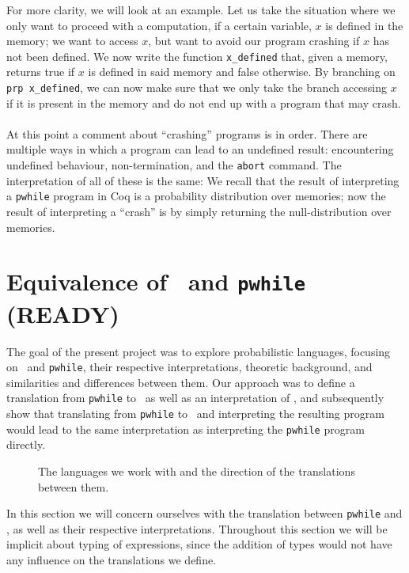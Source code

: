 \documentclass[11pt, leqno, titlepage]{article}
\theoremstyle{definition}
\begin{document}
For more clarity, we will look at an example. Let us take the situation where we only
want to proceed with a computation, if a certain variable, $x$ is defined in the
memory; we want to access $x$, but want to avoid our program crashing if $x$ has not
been defined. We now write the function \texttt{x\_defined} that, given a memory,
returns true if $x$ is defined in said memory and false otherwise. By branching on
\texttt{prp x\_defined}, we can now make sure that we only take the branch accessing
$x$ if it is present in the memory and do not end up with a program that may
crash. \\
\\
At this point a comment about ``crashing'' programs is in order. There are multiple
ways in which a program can lead to an undefined result: encountering undefined
behaviour, non-termination, and the \texttt{abort} command. The interpretation of all
of these is the same: We recall that the result of interpreting a \texttt{pwhile}
program in Coq is a probability distribution over memories; now the result of
interpreting a ``crash'' is by simply returning the null-distribution over memories.


\section{Equivalence of \rml\ and \texttt{pwhile} (READY)}
\label{sec:approach}
The goal of the present project was to explore probabilistic languages, focusing on
\rml\ and \texttt{pwhile}, their respective interpretations, theoretic background,
and similarities and differences between them. Our approach was to define a
translation from \texttt{pwhile} to \rml\ as well as an interpretation of \rml,
and subsequently show that translating from \texttt{pwhile} to \rml\ and interpreting
the resulting program would lead to the same interpretation as interpreting the
\texttt{pwhile} program directly.

\begin{figure}[h]
  \centering
  \caption{The languages we work with and the direction of the translations between
    them. }
  \label{fig:triangle}
\end{figure}

In this section we will concern ourselves with the translation between
\texttt{pwhile} and \rml, as well as their respective interpretations. Throughout
this section we will be implicit about typing of expressions, since the addition of
types would not have any influence on the translations we define. 
\end{document}
